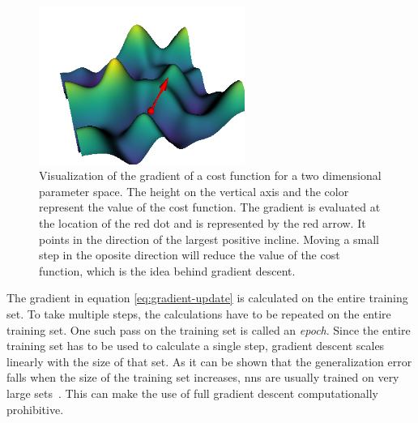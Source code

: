 \begin{figure}
	\centering
	\includegraphics[width=0.6\textwidth]{chapters/foundations/sections/ml/images/gradient.png}
	\caption[Gradient]{Visualization of the gradient of a cost function for a two dimensional parameter space. The height on the vertical axis and the color represent the value of the cost function. The gradient is evaluated at the location of the red dot and is represented by the red arrow. It points in the direction of the largest positive incline. Moving a small step in the oposite direction will reduce the value of the cost function, which is the idea behind gradient descent.}\label{fig:gradient}
\end{figure}

The gradient in equation \eqref{eq:gradient-update} is calculated on the entire training set. To take multiple steps, the calculations have to be repeated on the entire training set. One such pass on the training set is called an \emph{epoch}. Since the entire training set has to be used to calculate a single step, gradient descent scales linearly with the size of that set. As it can be shown that the generalization error falls when the size of the training set increases, \acrshort{nn}s are usually trained on very large sets~\cite{Goodfellow:2016:DNN}. %
This can make the use of full gradient descent computationally prohibitive.

